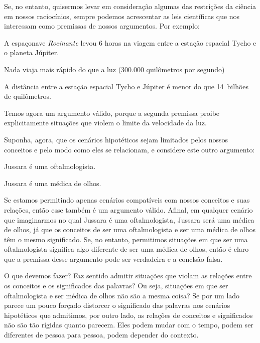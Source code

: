 Se, no entanto, quisermos levar em consideração algumas das restrições da ciência em nossos raciocínios, sempre podemos acrescentar as leis científicas que nos interessam como premissas de nossos argumentos.
Por exemplo:
	\begin{earg}
		\item[] A espaçonave \emph{Rocinante} levou 6 horas na viagem entre a estação espacial Tycho e o planeta Júpiter.
		\item[] Nada viaja mais rápido do que a luz (300.000 quilômetros por segundo)
		\item[\therefore] A distância entre a estação espacial Tycho e Júpiter é menor do que 14~bilhões de quilômetros.
	\end{earg}
Temos agora um argumento válido, porque a segunda premissa proibe explicitamente situações que violem o limite da velocidade da luz.

Suponha, agora, que os cenários hipotéticos sejam limitados pelos nossos conceitos e pelo modo como eles se relacionam, e considere este outro argumento:
	\begin{earg}
		\item[] Jussara é uma oftalmologista.
		\item[\therefore] Jussara é uma médica de olhos.
	\end{earg}
Se estamos permitindo apenas cenários compatíveis com nossos conceitos e suas relações, então esse também é um argumento válido.
Afinal, em qualquer cenário que imaginarmos no qual Jussara é uma oftalmologista, Jussara será uma médica de olhos, já que os conceitos de ser uma oftalmologista e ser uma médica de olhos têm o mesmo significado.
Se, no entanto, permitimos situações em que ser uma oftalmologista significa algo diferente de ser uma médica de olhos, então é claro que a premissa desse argumento pode ser verdadeira e a conclsão falsa.

O que devemos fazer?
Faz sentido admitir situações que violam as relações entre os conceitos e os significados das palavras?
Ou seja, situações em que ser oftalmologista e ser médica de olhos não são a mesma coisa?
Se por um lado parece um pouco forçado distorcer o significado das palavras nos cenários hipotéticos que admitimos, por outro lado, as relações de conceitos e significados  não são tão rígidas quanto parecem.
Eles podem mudar com o tempo, podem ser diferentes de pessoa para pessoa, podem depender do contexto.

